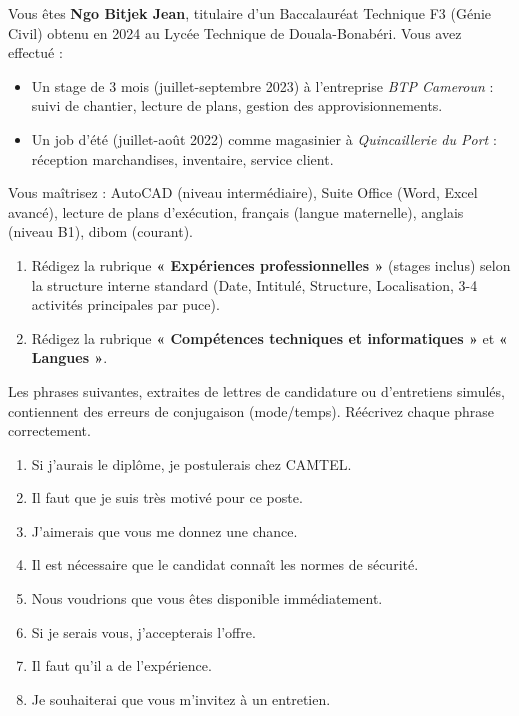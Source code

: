 \documentclass[11pt]{article}
\begin{document}
\begin{exercice}
Vous êtes \textbf{Ngo Bitjek Jean}, titulaire d'un Baccalauréat Technique F3 (Génie Civil) obtenu en 2024 au Lycée Technique de Douala-Bonabéri. Vous avez effectué :
\begin{itemize}
\item Un stage de 3 mois (juillet-septembre 2023) à l'entreprise \emph{BTP Cameroun} : suivi de chantier, lecture de plans, gestion des approvisionnements.
\item Un job d'été (juillet-août 2022) comme magasinier à \emph{Quincaillerie du Port} : réception marchandises, inventaire, service client.
\end{itemize}
Vous maîtrisez : AutoCAD (niveau intermédiaire), Suite Office (Word, Excel avancé), lecture de plans d'exécution, français (langue maternelle), anglais (niveau B1), dibom (courant).
\begin{enumerate}
\item Rédigez la rubrique \textbf{« Expériences professionnelles »} (stages inclus) selon la structure interne standard (Date, Intitulé, Structure, Localisation, 3-4 activités principales par puce).
\item Rédigez la rubrique \textbf{« Compétences techniques et informatiques »} et \textbf{« Langues »}.
\end{enumerate}
\end{exercice}

\begin{exercice}
Les phrases suivantes, extraites de lettres de candidature ou d'entretiens simulés, contiennent des erreurs de conjugaison (mode/temps). Réécrivez chaque phrase correctement.
\begin{enumerate}
\item Si j'aurais le diplôme, je postulerais chez CAMTEL.
\item Il faut que je suis très motivé pour ce poste.
\item J'aimerais que vous me donnez une chance.
\item Il est nécessaire que le candidat connaît les normes de sécurité.
\item Nous voudrions que vous êtes disponible immédiatement.
\item Si je serais vous, j'accepterais l'offre.
\item Il faut qu'il a de l'expérience.
\item Je souhaiterai que vous m'invitez à un entretien.
\end{enumerate}
\end{exercice}
\end{document}

